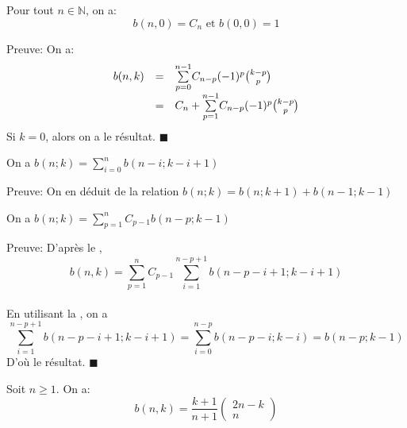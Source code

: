 \begin{corollaire} \label{cor3.8}
	Pour tout $n \in \mathbb{N}$, on a: $$b(n,0)=C_{n} \text{ et } b(0,0)=1$$
\end{corollaire}
Preuve: On a:
\[\begin{array}{r c  l}b(n,k) & = & \underset{p=0}{\overset{n-1}{\sum}}C_{n-p}(-1)^p\binom{k-p}{p}       \\
                            & = & C_{n}+\underset{p=1}{\overset{n-1}{\sum}}C_{n-p}(-1)^p\binom{k-p}{p}
	\end{array}\]
Si $k=0$, alors on a le résultat. \vspace{10pt}$\blacksquare$
\begin{proposition}\label{p3}
	On a $b(n; k) = \sum\limits_{i=0}^{n}b(n-i; k-i+1)$
\end{proposition}
Preuve: On en déduit de la relation $b(n; k) = b(n; k+1) + b(n-1; k-1)$
\begin{corollaire}
	On a $b(n; k) = \sum\limits_{p=1}^{n}C_{p-1}b(n-p; k-1)$
\end{corollaire}
Preuve: D'après le , $$b(n,k) = \sum\limits_{p=1}^{n}C_{p-1}\sum\limits_{i=1}^{n-p+1}b(n-p-i+1; k-i+1)$$\\
En utilisant la , on a
$$\sum\limits_{i=1}^{n-p+1}b(n-p-i+1; k-i+1) = \sum\limits_{i=0}^{n-p}b(n-p-i; k-i) =  b(n-p; k-1)$$
D'où le résultat. $\blacksquare$

\begin{proposition} \label{genbnk}
	Soit $n\geq 1$. On a:
	\begin{equation} \label{eq:genbnk}
		b(n,k)=\frac{k+1}{n+1}
		\begin{pmatrix}
			2n-k \\n
		\end{pmatrix}
	\end{equation}
\end{proposition}

